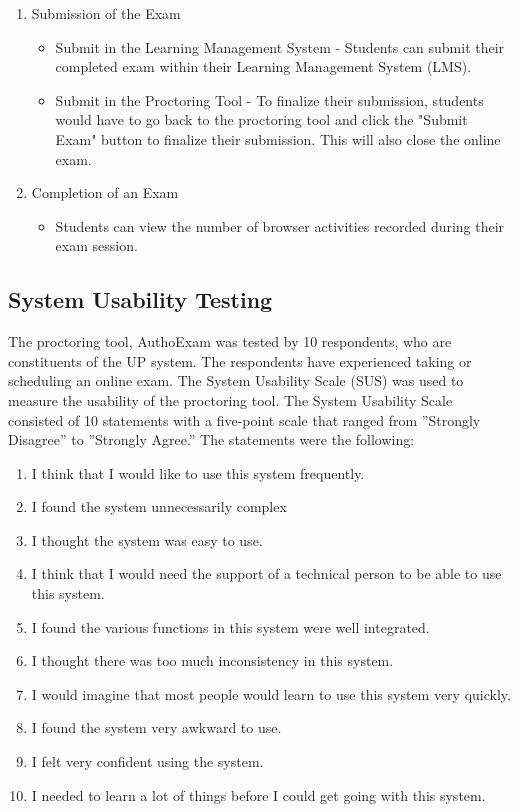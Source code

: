 \documentclass{icsthesis}
\begin{document}
\begin{mainmatter}
\begin{enumerate}
\begin{itemize}
        \end{itemize}

         \item Submission of the Exam
        \begin{itemize}
            \item Submit in the Learning Management System - Students can submit their completed exam within their Learning Management System (LMS).
            \item Submit in the Proctoring Tool - To finalize their submission, students would have to go back to the proctoring tool and click the "Submit Exam" button to finalize their submission. This will also close the online exam.
        \end{itemize}

         \item Completion of an Exam
        \begin{itemize}
            \item Students can view the number of browser activities recorded during their exam session.
            \end{itemize}
\end{enumerate}

\subsection{System Usability Testing}
The proctoring tool, AuthoExam was tested by 10 respondents, who are constituents of the UP system. The respondents have experienced taking or scheduling an online exam. The System Usability Scale (SUS) was used to measure the usability of the proctoring tool. The System Usability Scale consisted of 10 statements with a five-point scale that ranged from ”Strongly Disagree” to ”Strongly Agree.” The statements were the following:
    \begin{enumerate}
        \item I think that I would like to use this system frequently.
        \item I found the system unnecessarily complex
        \item I thought the system was easy to use.
        \item I think that I would need the support of a technical person to be able to use this system.
        \item I found the various functions in this system were well integrated.
        \item I thought there was too much inconsistency in this system. 
        \item I would imagine that most people would learn to use this system very quickly.
        \item I found the system very awkward to use.
        \item I felt very confident using the system.
        \item I needed to learn a lot of things before I could get going with this system.
    \end{enumerate}


\end{mainmatter}
\end{document}
